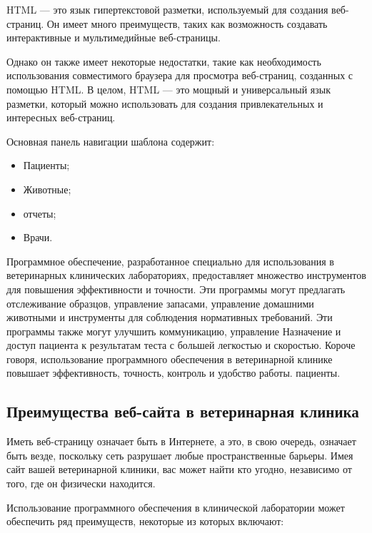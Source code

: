 HTML — это язык гипертекстовой разметки, используемый для создания веб-страниц. Он имеет много преимуществ, таких как возможность создавать интерактивные и мультимедийные веб-страницы.

Однако он также имеет некоторые недостатки, такие как необходимость использования совместимого браузера для просмотра веб-страниц, созданных с помощью HTML. В целом, HTML — это мощный и универсальный язык разметки, который можно использовать для создания привлекательных и интересных веб-страниц.

Основная панель навигации шаблона содержит:
\begin{itemize}
\item  Пациенты;
\item  Животные;
\item  отчеты;
\item  Врачи.
\end{itemize}
Программное обеспечение, разработанное специально для использования в ветеринарных клинических лабораториях, предоставляет множество инструментов для повышения эффективности и точности. Эти программы могут предлагать отслеживание образцов, управление запасами, управление домашними животными и инструменты для соблюдения нормативных требований. Эти программы также могут улучшить коммуникацию, управление
Назначение и доступ пациента к результатам теста с большей легкостью и скоростью. Короче говоря, использование программного обеспечения в ветеринарной клинике повышает эффективность, точность, контроль и удобство работы.
пациенты.

\subsection{Преимущества веб-сайта в ветеринарная клиника}

Иметь веб-страницу означает быть в Интернете, а это, в свою очередь, означает быть везде, поскольку сеть разрушает любые пространственные барьеры. Имея сайт вашей ветеринарной клиники, вас может найти кто угодно, независимо от того, где он физически находится.

Использование программного обеспечения в клинической лаборатории может обеспечить ряд преимуществ, некоторые из которых включают:

